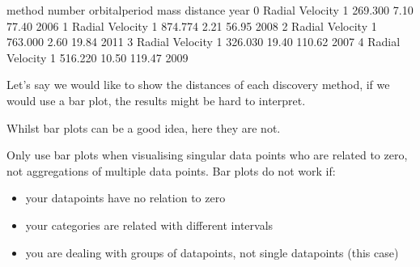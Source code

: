 \documentclass[letterpaper,10pt,english]{jupyterBook}
\begin{document}
\begin{sphinxVerbatim}[commandchars=\\\{\}]
  
\end{sphinxVerbatim}

\begin{sphinxVerbatim}[commandchars=\\\{\}]
            method  number  orbital\PYGZus{}period   mass  distance  year
0  Radial Velocity       1         269.300   7.10     77.40  2006
1  Radial Velocity       1         874.774   2.21     56.95  2008
2  Radial Velocity       1         763.000   2.60     19.84  2011
3  Radial Velocity       1         326.030  19.40    110.62  2007
4  Radial Velocity       1         516.220  10.50    119.47  2009
\end{sphinxVerbatim}

\sphinxAtStartPar
Let’s say we would like to show the distances of each discovery method, if we would use a bar plot, the results might be hard to interpret.

\begin{sphinxVerbatim}[commandchars=\\\{\}]
    
\end{sphinxVerbatim}

\begin{sphinxVerbatim}[commandchars=\\\{\}]
[None]
\end{sphinxVerbatim}

\noindent{}

\sphinxAtStartPar
Whilst bar plots can be a good idea, here they are not.

\sphinxAtStartPar
Only use bar plots when visualising singular data points who are related to zero, not aggregations of multiple data points.
Bar plots do not work if:
\begin{itemize}
\item {} 
\sphinxAtStartPar
your datapoints have no relation to zero

\item {} 
\sphinxAtStartPar
your categories are related with different intervals

\item {} 
\sphinxAtStartPar
you are dealing with groups of datapoints, not single datapoints (this case)

\end{itemize}
\end{document}
